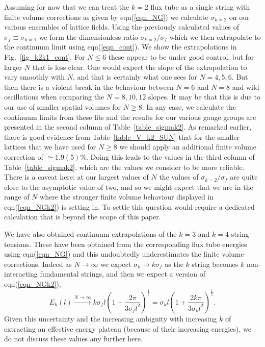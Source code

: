 \documentclass[12pt]{article}
\begin{document}
Assuming for now that we can treat the $k=2$ flux tube as a single string with
finite volume corrections as given by  eqn(\ref{eqn_NG}) we calculate $\sigma_{k=2}$
on our various ensembles of lattice fields. Using the previously calculated
values of $\sigma_f \equiv \sigma_{k=1}$ we form the dimensionless ratio
$\sigma_{k=2}/\sigma_f$ which we then extrapolate to the continuum limit using
eqn(\ref{eqn_cont}). We show the extrapolations in Fig.~\ref{fig_k2k1_cont}.
For $N\leq 6$ these appear to be under good control, but for larger $N$ that
is less clear. One would expect the slope of the extrapolation to vary smoothly
with $N$, and that is certainly what one sees for $N=4,5,6$. But then
there is a violent break in the behaviour between $N=6$ and $N=8$
and wild oscillations when comparing  the $N=8,10,12$ slopes.
It may be that this is due to our use of smaller spatial volumes for $N\geq 8$.
In any case, we calculate the continuum limits from these fits and the
results for our various gauge groups are presented
in the second column of Table~\ref{table_sigmak2}. As remarked earlier, there
is good evidence from Table~\ref{table_V_k2_SUN} that for the smaller lattices
that we have used for $N\geq 8$ we should apply an additional finite volume correction of
$\simeq 1.9(5)\%$. Doing this leads to the values in the third column of
Table~\ref{table_sigmak2}, which are the values we consider to be more reliable.
There is a caveat here: at our largest values of $N$ the values of $\sigma_{k=2}/\sigma_f$
are quite close to the asymptotic value of two, and so we might expect that we are in
the range of $N$ where the stronger finite volume behaviour displayed in eqn(\ref{eqn_NGk2}) 
is setting in. To settle this question would require a dedicated calculation that is
beyond the scope of this paper.

We have also obtained continuum extrapolations of the $k=3$ and $k=4$ string tensions.
These have been obtained from the corresponding flux tube energies using eqn(\ref{eqn_NG})
and this undoubtedly underestimates the finite volume corrections. Indeed as $N\to\infty$
we expect $\sigma_k\to k \sigma_f$ as the $k$-string becomes $k$ non-interacting
fundamental strings, and then we expect a version of eqn(\ref{eqn_NGk2}),
%
\begin{equation}
  E_k(l) \stackrel{N\to\infty}{\longrightarrow}
  k\sigma_f l\left( 1 + \frac{2\pi}{3\sigma_f l^2}\right)^{\frac{1}{2}}
  =
  \sigma_k l\left( 1 + \frac{2k\pi}{3\sigma_k l^2}\right)^{\frac{1}{2}}.
  \label{eqn_NGk}
\end{equation}
%
Given this uncertainty and the increasing ambiguity with increasing $k$ of extracting
an effective energy plateau (because of their increasing energies), we do not
discuss these values any further here.
\end{document}
